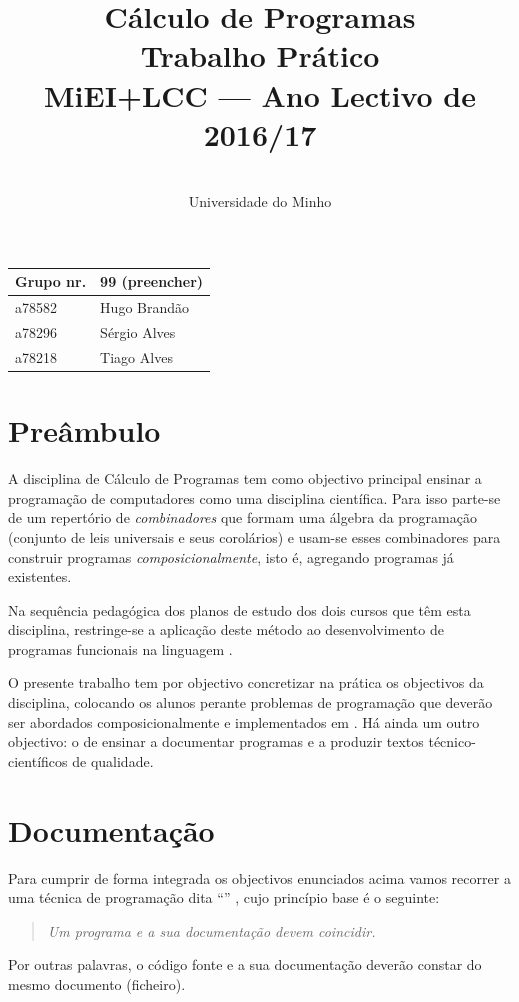 \documentclass[a4paper]{article}
\title{
       	Cálculo de Programas
\\
       	Trabalho Prático
\\
       	MiEI+LCC --- Ano Lectivo de 2016/17
}
\author{
       	\dium
\\
       	Universidade do Minho
}
\date\mydate
\begin{document}
\maketitle

\begin{center}\large
\begin{tabular}{ll}
\textbf{Grupo} nr. & 99 (preencher)
\\
\hline
a78582 & Hugo Brandão
\\
a78296 & Sérgio Alves
\\
a78218 & Tiago Alves
\end{tabular}
\end{center}

\tableofcontents

\newpage

\section{Preâmbulo}

A disciplina de Cálculo de Programas tem como objectivo principal ensinar
a progra\-mação de computadores como uma disciplina científica. Para isso
parte-se de um repertório de \emph{combinadores} que formam uma álgebra da
programação (conjunto de leis universais e seus corolários) e usam-se esses
combinadores para construir programas \emph{composicionalmente}, isto é,
agregando programas já existentes.

Na sequência pedagógica dos planos de estudo dos dois cursos que têm esta
disciplina, restringe-se a aplicação deste método ao desenvolvimento de programas
funcionais na linguagem \Haskell.

O presente trabalho tem por objectivo concretizar na prática os objectivos
da disciplina, colocando os alunos perante problemas de programação que
deverão ser abordados composicionalmente e implementados em \Haskell.
Há ainda um outro objectivo: o de ensinar a documentar programas e
a produzir textos técnico-científicos de qualidade.

\section{Documentação}
Para cumprir de forma integrada os objectivos enunciados acima vamos recorrer
a uma técnica de programa\-ção dita ``'' \cite{Kn92}, cujo
princípio base é o seguinte:
\begin{quote}\em
Um programa e a sua documentação devem coincidir.
\end{quote}
Por outras palavras, o código fonte e a sua documentação deverão constar
do mesmo documento (ficheiro).
\end{document}
